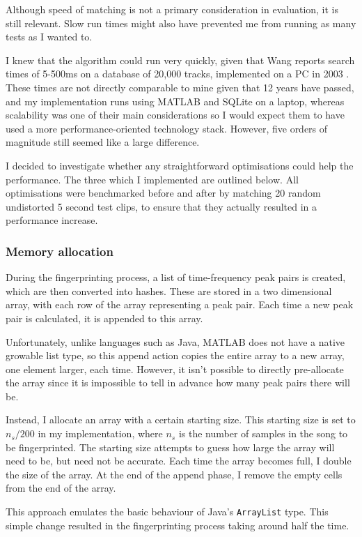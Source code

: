 \documentclass[12pt,a4paper,twoside,openright]{report}
\begin{document}
Although speed of matching is not a primary consideration in evaluation, it is still relevant. Slow run times might also have prevented me from running as many tests as I wanted to. 

I knew that the algorithm could run very quickly, given that Wang reports search times of 5-500ms on a database of 20,000 tracks, implemented on a PC in 2003 \cite{Wang03}. These times are not directly comparable to mine given that 12 years have passed, and my implementation runs using MATLAB and SQLite on a laptop, whereas scalability was one of their main considerations so I would expect them to have used a more performance-oriented technology stack. However, five orders of magnitude still seemed like a large difference. 

I decided to investigate whether any straightforward optimisations could help the performance. The three which I implemented are outlined below. All optimisations were benchmarked before and after by matching 20 random undistorted 5 second test clips, to ensure that they actually resulted in a performance increase.

\subsubsection{Memory allocation}

During the fingerprinting process, a list of time-frequency peak pairs is created, which are then converted into hashes. These are stored in a two dimensional array, with each row of the array representing a peak pair. Each time a new peak pair is calculated, it is appended to this array.

Unfortunately, unlike languages such as Java, MATLAB does not have a native growable list type, so this append action copies the entire array to a new array, one element larger, each time. However, it isn't possible to directly pre-allocate the array since it is impossible to tell in advance how many peak pairs there will be.

Instead, I allocate an array with a certain starting size. This starting size is set to $n_s/200$ in my implementation, where $n_s$ is the number of samples in the song to be fingerprinted. The starting size attempts to guess how large the array will need to be, but need not be accurate. Each time the array becomes full, I double the size of the array. At the end of the append phase, I remove the empty cells from the end of the array.

This approach emulates the basic behaviour of Java's \lstinline{ArrayList} type. This simple change resulted in the fingerprinting process taking around half the time.
\end{document}

